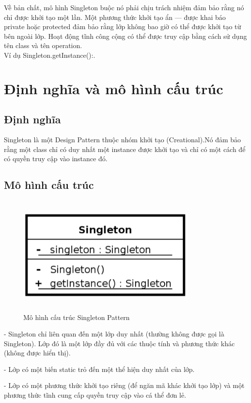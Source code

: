 Về bản chất, mô hình Singleton buộc nó phải chịu trách nhiệm đảm bảo rằng nó chỉ được khởi tạo một lần. Một phương thức khởi tạo ẩn — được khai báo private hoặc protected đảm bảo rằng lớp không bao giờ có thể được khởi tạo từ bên ngoài lớp. Hoạt động tĩnh công cộng có thể được truy cập bằng cách sử dụng tên class và tên operation.\\Ví dụ Singleton.getInstance():.

\section{Định nghĩa và mô hình cấu trúc}

\subsection{Định nghĩa}
Singleton là một Design Pattern thuộc nhóm khởi tạo (Creational).Nó đảm bảo rằng một class chỉ có duy nhất một instance được khởi tạo và chỉ có một cách để có quyền truy cập vào instance đó.

\subsection{Mô hình cấu trúc}
\begin{figure}[!htb]
    \centering
    \includegraphics[height=6cm,width=9cm] {fig/Singleton/structure_singleton.png}
    \caption{Mô hình cấu trúc Singleton Pattern}
    \label{fig:structure_singleton}
\end{figure}

- Singleton chỉ liên quan đến một lớp duy nhất (thường không được gọi là Singleton). Lớp đó là một lớp đầy đủ với các thuộc tính và phương thức khác (không được hiển thị).
    
- Lớp có một biến static trỏ đến một thể hiện duy nhất của lớp.
    
- Lớp có một phương thức khởi tạo riêng (để ngăn mã khác khởi tạo lớp) và một phương thức tĩnh cung cấp quyền truy cập vào cá thể đơn lẻ.

